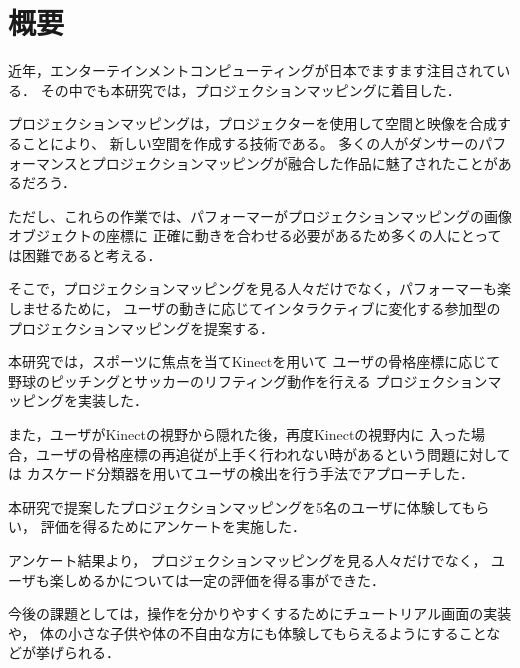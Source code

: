 \chapter*{概要}

近年，エンターテインメントコンピューティングが日本でますます注目されている．
その中でも本研究では，プロジェクションマッピングに着目した．

プロジェクションマッピングは，プロジェクターを使用して空間と映像を合成することにより、
新しい空間を作成する技術である。
多くの人がダンサーのパフォーマンスとプロジェクションマッピングが融合した作品に魅了されたことがあるだろう．

ただし、これらの作業では、パフォーマーがプロジェクションマッピングの画像オブジェクトの座標に
正確に動きを合わせる必要があるため多くの人にとっては困難であると考える．

そこで，プロジェクションマッピングを見る人々だけでなく，パフォーマーも楽しませるために，
ユーザの動きに応じてインタラクティブに変化する参加型のプロジェクションマッピングを提案する．

本研究では，スポーツに焦点を当てKinectを用いて
ユーザの骨格座標に応じて野球のピッチングとサッカーのリフティング動作を行える
プロジェクションマッピングを実装した．

また，ユーザがKinectの視野から隠れた後，再度Kinectの視野内に
入った場合，ユーザの骨格座標の再追従が上手く行われない時があるという問題に対しては
カスケード分類器を用いてユーザの検出を行う手法でアプローチした．

本研究で提案したプロジェクションマッピングを5名のユーザに体験してもらい，
評価を得るためにアンケートを実施した．

アンケート結果より，
プロジェクションマッピングを見る人々だけでなく，
ユーザも楽しめるかについては一定の評価を得る事ができた．

今後の課題としては，操作を分かりやすくするためにチュートリアル画面の実装や，
体の小さな子供や体の不自由な方にも体験してもらえるようにすることなどが挙げられる．